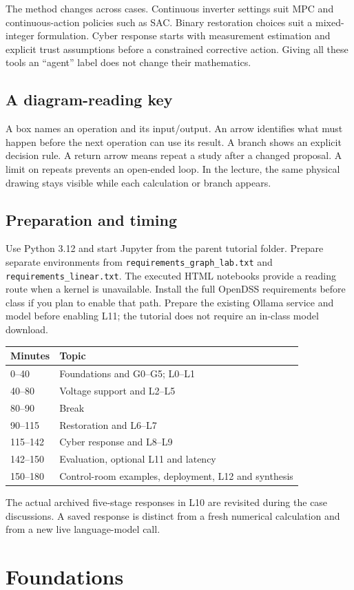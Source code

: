 \documentclass[11pt]{article}
\begin{document}
The method changes across cases. Continuous inverter settings suit MPC and continuous-action policies such as SAC. Binary restoration choices suit a mixed-integer formulation. Cyber response starts with measurement estimation and explicit trust assumptions before a constrained corrective action. Giving all these tools an ``agent'' label does not change their mathematics.

\subsection*{A diagram-reading key}
A box names an operation and its input/output. An arrow identifies what must happen before the next operation can use its result. A branch shows an explicit decision rule. A return arrow means repeat a study after a changed proposal. A limit on repeats prevents an open-ended loop. In the lecture, the same physical drawing stays visible while each calculation or branch appears.

\subsection*{Preparation and timing}
Use Python 3.12 and start Jupyter from the parent tutorial folder. Prepare separate environments from \texttt{requirements\_graph\_lab.txt} and \texttt{requirements\_linear.txt}. The executed HTML notebooks provide a reading route when a kernel is unavailable. Install the full OpenDSS requirements before class if you plan to enable that path. Prepare the existing Ollama service and model before enabling L11; the tutorial does not require an in-class model download.
\begin{center}\begin{tabular}{ll}\toprule Minutes & Topic\\\midrule
0--40 & Foundations and G0--G5; L0--L1\\
40--80 & Voltage support and L2--L5\\
80--90 & Break\\
90--115 & Restoration and L6--L7\\
115--142 & Cyber response and L8--L9\\
142--150 & Evaluation, optional L11 and latency\\
150--180 & Control-room examples, deployment, L12 and synthesis\\\bottomrule
\end{tabular}\end{center}
The actual archived five-stage responses in L10 are revisited during the case discussions. A saved response is distinct from a fresh numerical calculation and from a new live language-model call.
\clearpage
\clearpage\section{Foundations}
\end{document}
